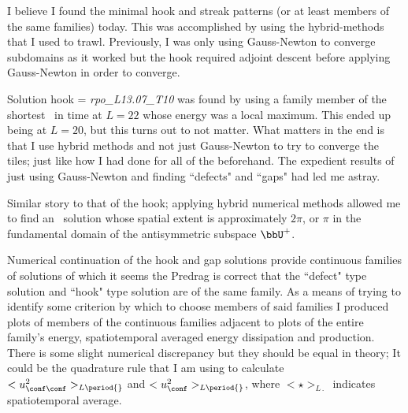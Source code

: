 

I believe I found the minimal hook and streak patterns (or at least
members of the same families) today. This was accomplished by using the
hybrid-methods that I used to trawl. Previously, I was only using
Gauss-Newton to converge subdomains as it worked but the hook required
adjoint descent before applying Gauss-Newton in order to converge.

Solution hook = \emph{rpo\_L13.07\_T10} was found by using a family
member of the shortest \ppo\ in time at $L=22$ whose energy was a local
maximum. This ended up being at $L=20$, but this turns out to not matter.
What matters in the end is that I use hybrid methods and not just
Gauss-Newton to try to converge the tiles; just like how I had done for
all of the {\twots} beforehand. The expedient results of
just using Gauss-Newton and finding ``defects" and ``gaps" had led me
astray.

Similar story to that of the hook; applying hybrid numerical methods
allowed me to find an \eqv\ solution whose spatial extent is
approximately $2\pi$, or $\pi$ in the fundamental domain of the
antisymmetric subspace $\bbU^+$.

Numerical continuation of the hook and gap solutions provide continuous
families of solutions of which it seems the Predrag is correct that the
``defect" type solution and ``hook" type solution are of the same family.
As a means of trying to identify some criterion by which to choose
members of said families I produced plots of members of the continuous
families adjacent to plots of the entire family's energy, spatiotemporal
averaged energy dissipation and production. There is some slight
numerical discrepancy but they should be equal in theory; It could be the
quadrature rule that I am using to calculate $<u_{\conf\conf}^2>_{L\period{}}$
and $<u_{\conf}^2>_{L\period{}}$, where $< \star >_{L\period{}}$ indicates
spatiotemporal average.